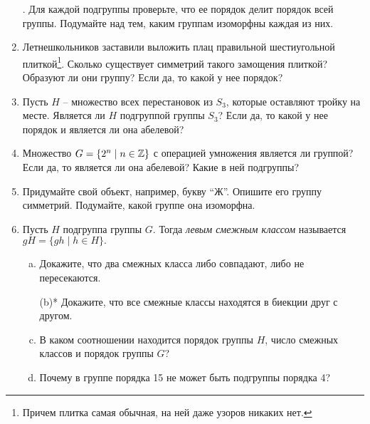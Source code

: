 \begin{enumerate}
.
    Для каждой подгруппы проверьте, что ее порядок делит порядок всей группы. Подумайте над тем, каким группам изоморфны каждая из них.
\item Летнешкольников заставили выложить плац правильной шестиугольной плиткой\footnote{Причем плитка самая обычная, на ней даже узоров никаких нет.}. Сколько существует симметрий такого замощения плиткой? Образуют ли они группу?
        Если да, то какой у нее порядок?
    \item Пусть $H$ -- множество всех перестановок из $S_3$, которые оставляют
        тройку на месте. Является ли $H$ подгруппой группы $S_3$?
        Если да, то какой у нее порядок и является ли она абелевой?
    \item Множество $G = \{2^n \mid n \in \mathbb Z\}$ с операцией умножения является ли группой?
        Если да, то является ли она абелевой? Какие в ней подгруппы?
    \item Придумайте свой объект, например, букву ``Ж''. Опишите его группу симметрий. Подумайте, какой группе она изоморфна.
    \item Пусть $H$ подгруппа группы $G$. Тогда \emph{левым смежным классом} называется \(gH =\{gh \mid h \in H\}.\)
        \begin{enumerate}[(a)]
        \item Докажите, что два смежных класса либо совпадают, либо не пересекаются.
        \item[(b)*] Докажите, что все смежные классы находятся в биекции друг с другом.
        \addtocounter{enumii}{1}
        \item В каком соотношении находится порядок группы $H$, число смежных классов и порядок группы $G$?
        \item Почему в группе порядка 15 не может быть подгруппы порядка 4?
        \end{enumerate}
\end{enumerate}

